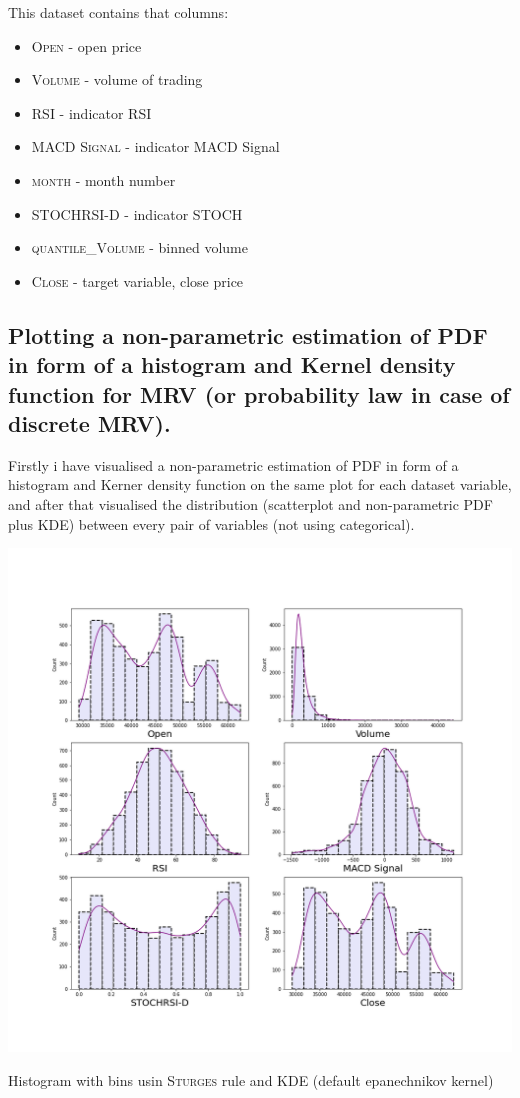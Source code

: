 \documentclass[%
12pt, %
final, %
oneside, %
onecolumn, %
centertags]{article} %
\theoremstyle{plain}
\theoremstyle{definition}
\theoremstyle{remark}
\begin{document}
This dataset contains that columns:

\begin{itemize}
	\item \textsc{Open} - open price
	\item \textsc{Volume} - volume of trading
	\item \textsc{RSI} - indicator RSI
	\item \textsc{MACD Signal} - indicator MACD Signal
	\item \textsc{month} - month number
	\item \textsc{STOCHRSI-D} - indicator STOCH
	\item \textsc{quantile\_Volume} - binned volume
	\item \textsc{Close} - target variable, close price
\end{itemize}

\newpage

\subsection{Plotting a non-parametric estimation of PDF in form of a histogram and Kernel density function for MRV (or probability law in case of discrete MRV).}

Firstly i have visualised a non-parametric estimation of PDF in form of a histogram and Kerner density function on the same plot for each dataset variable, and after that visualised the distribution (scatterplot and non-parametric PDF plus KDE) between every pair of variables (not using categorical). 


\begin{center}
\includegraphics[scale=0.45]{images/task_1_hist.png}

Histogram with bins usin \textsc{Sturges} rule and KDE (default epanechnikov kernel) 
\end{center}
\end{document}
